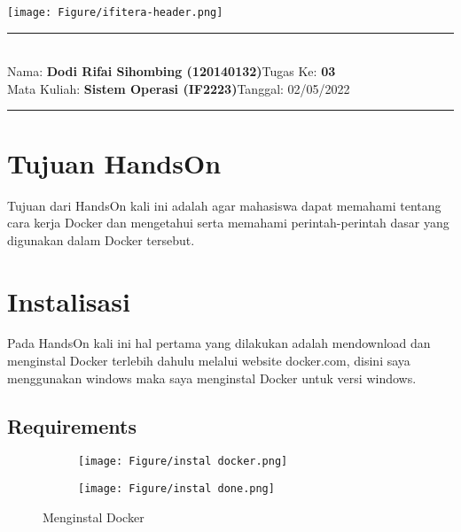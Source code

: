 \documentclass[11pt,a4paper]{article}
\newcommand{\student}{\textbf{Dodi Rifai Sihombing (120140132)}}
\newcommand{\course}{\textbf{Sistem Operasi (IF2223)}}
\newcommand{\assignment}{\textbf{03}}
\begin{document}
\thispagestyle{empty}
\begin{center}
	\texttt{[image: Figure/ifitera-header.png]}
	\vspace{0.1cm}
\end{center}
\noindent
\rule{17cm}{0.2cm}\\[0.3cm]
Nama: \student \hfill Tugas Ke: \assignment\\[0.1cm]
Mata Kuliah: \course \hfill Tanggal: 02/05/2022\\
\rule{17cm}{0.05cm}
\vspace{0.1cm}



\section{Tujuan HandsOn}
Tujuan dari HandsOn kali ini adalah agar mahasiswa dapat memahami tentang cara kerja Docker dan mengetahui serta memahami perintah-perintah dasar yang digunakan dalam Docker tersebut.


\section{Instalisasi}
Pada HandsOn kali ini hal pertama yang dilakukan adalah mendownload dan menginstal Docker terlebih dahulu melalui website docker.com, disini saya menggunakan windows maka saya menginstal Docker untuk versi windows.
\subsection{Requirements}
\begin{figure}[h]
        \centering
        \begin{subfigure}[b]{0.4\textwidth}
            \centering
            \def\svgwidth{\columnwidth}
            \texttt{[image: Figure/instal docker.png]}
        \end{subfigure}
        \qquad %
        \begin{subfigure}[b]{0.4\textwidth}
            \centering
            \def\svgwidth{\columnwidth}
            \texttt{[image: Figure/instal done.png]}
        \end{subfigure}
        \caption{Menginstal Docker}\label{fig:aug}
    \end{figure}
\end{document}
